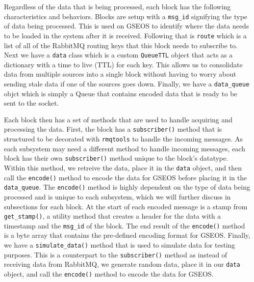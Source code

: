 Regardless of the data that is being processed, each block has the following characteristics and behaviors. 
Blocks are setup with a \texttt{msg\_id} signifying the type of data being processed. 
This is used on GSEOS to identify where the data needs to be loaded in the system after it is received.
Following that is \texttt{route} which is a list of all of the RabbitMQ routing keys that this block needs to subscribe to.
Next we have a \texttt{data} class which is a custom \texttt{QueueTTL} object that acts as a dictionary with a time to live (TTL) for each key.
This allows us to consolidate data from multiple sources into a single block without having to worry about sending stale data if one of the sources goes down.
Finally, we have a \texttt{data\_queue} objct which is simply a Queue that contains encoded data that is ready to be sent to the socket.

Each block then has a set of methods that are used to handle acquiring and processing the data.
First, the block has a \texttt{subscriber()} method that is structured to be decorated with \texttt{rmqtools} to handle the incoming messages.
As each subsystem may need a different method to handle incoming messages, each block has their own \texttt{subscriber()} method unique to the block's datatype.
Within this method, we retreive the data, place it in the \texttt{data} object, and then call the \texttt{encode()} method to encode the data for GSEOS before placing it in the \texttt{data\_queue}.
The \texttt{encode()} method is highly dependent on the type of data being processed and is unique to each subsystem, which we will further discuss in subsections for each block. 
At the start of each encoded message is a stamp from \texttt{get\_stamp()}, a utility method that creates a header for the data with a timestamp and the \texttt{msg\_id} of the block.
The end result of the \texttt{encode()} method is a byte array that contains the pre-defined encoding format for GSEOS.
Finally, we have a \texttt{simulate\_data()} method that is used to simulate data for testing purposes.
This is a counterpart to the \texttt{subscriber()} method as instead of receiving data from RabbitMQ, we generate random data, place it in our \texttt{data} object, and call the \texttt{encode()} method to encode the data for GSEOS.

